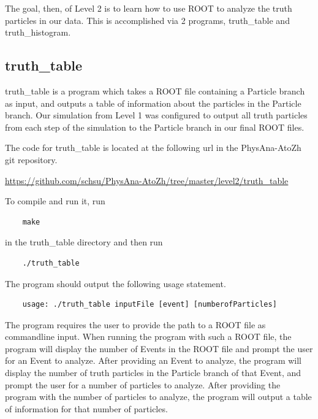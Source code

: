\documentclass{article}
\begin{document}
\bigskip

The goal, then, of Level 2 is to learn how to use ROOT to analyze the truth particles in our data. This is accomplished via 2 programs, truth\_table and truth\_histogram.

\subsection{truth\_table}

truth\_table is a program which takes a ROOT file containing a Particle branch as input, and outputs a table of information about the particles in the Particle branch. Our simulation from Level 1 was configured to output all truth particles from each step of the simulation to the Particle branch in our final ROOT files.

\bigskip

The code for truth\_table is located at the following url in the PhysAna-AtoZh git repository.

\bigskip

\url{https://github.com/schsu/PhysAna-AtoZh/tree/master/level2/truth_table}

\bigskip

To compile and run it, run

\begin{verbatim}
	make
\end{verbatim} 

in the truth\_table directory and then run

\begin{verbatim}
	./truth_table
\end{verbatim}

The program should output the following usage statement.

\begin{verbatim}
	usage: ./truth_table inputFile [event] [numberofParticles]
\end{verbatim}

The program requires the user to provide the path to a ROOT file as commandline input. When running the program with such a ROOT file, the program will display the number of Events in the ROOT file and prompt the user for an Event to analyze. After providing an Event to analyze, the program will display the number of truth particles in the Particle branch of that Event, and prompt the user for a number of particles to analyze. After providing the program with the number of particles to analyze, the program will output a table of information for that number of particles.
\end{document}
